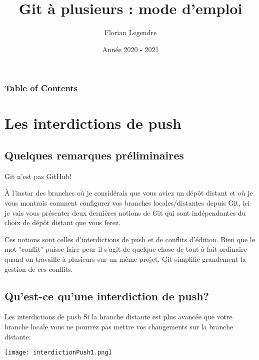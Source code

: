 \documentclass{beamer}
\title[Git collaboratif]{Git à plusieurs : mode d'emploi}
\author{Florian Legendre}
\institute{Université de Poitiers}
\date{Année 2020 - 2021}
\begin{document}
\frame{\titlepage}

\begin{frame}
\frametitle{Table of Contents}
\tableofcontents[hideallsubsections]
\end{frame}



\section{Les interdictions de push}

\subsection{Quelques remarques préliminaires}
\begin{frame}{Git n'est pas GitHub!}

À l'instar des branches où je considérais que vous aviez un dépôt distant et où je vous  montrais comment configurer vos branches locales/distantes depuis Git, ici je vais vous présenter deux dernières notions de Git qui sont indépendantes du choix de dépôt distant que vous ferez.\\
\medskip

Ces notions sont celles d'interdictions de push et de conflits d'édition. Bien que le mot "conflit" puisse faire peur il s'agit de quelque-chose de tout à fait ordinaire quand on travaille à plusieurs sur un même projet. Git simplifie grandement la gestion de ces conflits.\\
\end{frame}


\subsection{Qu'est-ce qu'une interdiction de push?}
\begin{frame}{Les interdictions de push}
Si la branche distante est plus avancée que votre branche locale vous ne pourrez pas mettre vos changements sur la branche distante:

\begin{center}
	\texttt{[image: interdictionPush1.png]}
\end{center}
\end{frame}
\end{document}
